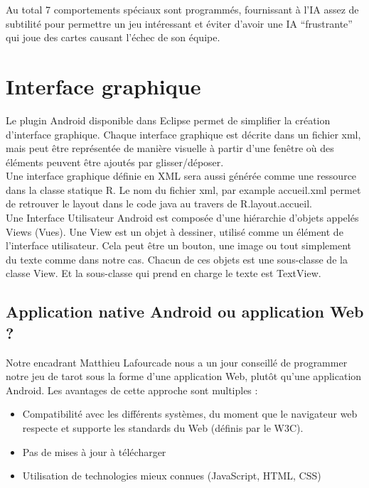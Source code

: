 \documentclass[a4paper]{report}
\begin{document}
Au total 7 comportements spéciaux sont programmés, fournissant à l’IA assez de subtilité pour permettre un jeu intéressant et éviter d’avoir une IA “frustrante” qui joue des cartes causant l'échec de son équipe.\\

	\section{Interface graphique}
		Le plugin Android disponible dans Eclipse permet de simplifier la création d'interface graphique.
		Chaque interface graphique est décrite dans un fichier xml, mais peut être représentée de manière
		visuelle à partir d'une fenêtre où des éléments peuvent être ajoutés par glisser/déposer.\\
		Une interface graphique définie en XML sera aussi générée comme une ressource dans la classe statique
		R. Le nom du fichier xml, par example accueil.xml permet de retrouver le layout dans le code java au
		travers de R.layout.accueil.\\
		Une Interface Utilisateur Android est composée d’une hiérarchie d’objets appelés Views (Vues).
		Une View est un objet à dessiner, utilisé comme un élément de l’interface utilisateur. Cela peut être un bouton, une image ou tout simplement du texte comme dans notre cas. Chacun de 			ces objets est une sous-classe de la classe View. Et la sous-classe qui prend en charge le texte est TextView.\\
		
		\subsection{Application native Android ou application Web ?}
			Notre encadrant Matthieu Lafourcade nous a un jour conseillé de programmer notre jeu de tarot sous la forme d’une application Web, plutôt qu’une application Android. Les 				avantages de cette approche sont multiples :\\
			\begin{itemize}
			    \item Compatibilité avec les différents systèmes, du moment que le navigateur web respecte et supporte les standards du Web (définis par le W3C).
			    \item Pas de mises à jour à télécharger
			    \item Utilisation de technologies mieux connues (JavaScript, HTML, CSS)
			\end{itemize}
\end{document}
